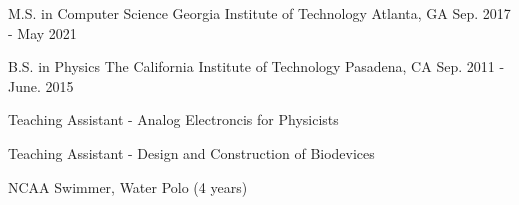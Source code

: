 

\begin{cventries}

  \cventry
    {M.S. in Computer Science}
    {Georgia Institute of Technology}
    {Atlanta, GA}
    {Sep. 2017 - May 2021}
    {
    }

  \cventry
    {B.S. in Physics} %
    {The California Institute of Technology} %
    {Pasadena, CA} %
    {Sep. 2011 - June. 2015} %
    {
      \begin{cvitems}
        \item{Teaching Assistant - Analog Electroncis for Physicists}
        \item{Teaching Assistant - Design and Construction of Biodevices}
        \item{NCAA Swimmer, Water Polo (4 years)}
      \end{cvitems}
    }



\end{cventries}
